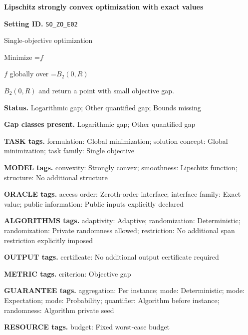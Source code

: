 \documentclass[10pt,a4paper]{article}
\newcommand{\AtlasMath}[1]{\par\begingroup\centering\setbox0=\hbox{$\displaystyle #1$}\ifdim\wd0>1.4\linewidth\typeout{ATLAS WIDE FORMULA: \the\wd0}\fi\ifdim\wd0>\linewidth\resizebox{\linewidth}{!}{\box0}\else\box0\fi\par\endgroup}
\newcommand{\AtlasInlineMath}[1]{\begingroup\setbox0=\hbox{$#1$}\ifdim\wd0>.4\linewidth\endgroup\AtlasMath{#1}\else\endgroup$#1$\fi}
\begin{document}
\raggedright

{\LARGE\bfseries\sffamily\color{AtlasNavy} Lipschitz strongly convex optimization with exact values\par}\vspace{5pt}


\textbf{Setting ID.} \texttt{SO\_\allowbreak{}ZO\_\allowbreak{}E02}



Single-objective optimization



Minimize \AtlasInlineMath{f} globally over \AtlasInlineMath{B_2(0,R)} and return a point with small objective gap.



\textbf{Status.} Logarithmic gap; Other quantified gap; Bounds missing



\textbf{Gap classes present.} Logarithmic gap; Other quantified gap



\textbf{TASK tags.} formulation: Global minimization; solution concept: Global minimization; task family: Single objective



\textbf{MODEL tags.} convexity: Strongly convex; smoothness: Lipschitz function; structure: No additional structure



\textbf{ORACLE tags.} access order: Zeroth-order interface; interface family: Exact value; public information: Public inputs explicitly declared



\textbf{ALGORITHMS tags.} adaptivity: Adaptive; randomization: Deterministic; randomization: Private randomness allowed; restriction: No additional span restriction explicitly imposed



\textbf{OUTPUT tags.} certificate: No additional output certificate required



\textbf{METRIC tags.} criterion: Objective gap



\textbf{GUARANTEE tags.} aggregation: Per instance; mode: Deterministic; mode: Expectation; mode: Probability; quantifier: Algorithm before instance; randomness: Algorithm private seed



\textbf{RESOURCE tags.} budget: Fixed worst-case budget
\end{document}
